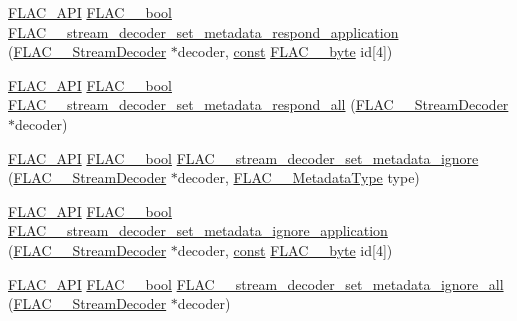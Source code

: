 \begin{DoxyCompactItemize}
\item 
\hyperlink{group__flac__export_ga56ca07df8a23310707732b1c0007d6f5}{F\+L\+A\+C\+\_\+\+A\+PI} \hyperlink{ordinals_8h_a95103469f1cbd78b8cf250194985b34e}{F\+L\+A\+C\+\_\+\+\_\+bool} \hyperlink{group__flac__stream__decoder_gabf2a1e945eb2a158090665e03ff55ad2}{F\+L\+A\+C\+\_\+\+\_\+stream\+\_\+decoder\+\_\+set\+\_\+metadata\+\_\+respond\+\_\+application} (\hyperlink{struct_f_l_a_c_____stream_decoder}{F\+L\+A\+C\+\_\+\+\_\+\+Stream\+Decoder} $\ast$decoder, \hyperlink{zconf_8h_a2c212835823e3c54a8ab6d95c652660e}{const} \hyperlink{ordinals_8h_a5eb569b12d5b047cdacada4d57924ee3}{F\+L\+A\+C\+\_\+\+\_\+byte} id\mbox{[}4\mbox{]})
\item 
\hyperlink{group__flac__export_ga56ca07df8a23310707732b1c0007d6f5}{F\+L\+A\+C\+\_\+\+A\+PI} \hyperlink{ordinals_8h_a95103469f1cbd78b8cf250194985b34e}{F\+L\+A\+C\+\_\+\+\_\+bool} \hyperlink{group__flac__stream__decoder_gaf3bec52172d727a4db8209b82db00c84}{F\+L\+A\+C\+\_\+\+\_\+stream\+\_\+decoder\+\_\+set\+\_\+metadata\+\_\+respond\+\_\+all} (\hyperlink{struct_f_l_a_c_____stream_decoder}{F\+L\+A\+C\+\_\+\+\_\+\+Stream\+Decoder} $\ast$decoder)
\item 
\hyperlink{group__flac__export_ga56ca07df8a23310707732b1c0007d6f5}{F\+L\+A\+C\+\_\+\+A\+PI} \hyperlink{ordinals_8h_a95103469f1cbd78b8cf250194985b34e}{F\+L\+A\+C\+\_\+\+\_\+bool} \hyperlink{group__flac__stream__decoder_ga0fb395d7c18c136d5a84869f6f2d736f}{F\+L\+A\+C\+\_\+\+\_\+stream\+\_\+decoder\+\_\+set\+\_\+metadata\+\_\+ignore} (\hyperlink{struct_f_l_a_c_____stream_decoder}{F\+L\+A\+C\+\_\+\+\_\+\+Stream\+Decoder} $\ast$decoder, \hyperlink{group__flac__format_gac71714ba8ddbbd66d26bb78a427fac01}{F\+L\+A\+C\+\_\+\+\_\+\+Metadata\+Type} type)
\item 
\hyperlink{group__flac__export_ga56ca07df8a23310707732b1c0007d6f5}{F\+L\+A\+C\+\_\+\+A\+PI} \hyperlink{ordinals_8h_a95103469f1cbd78b8cf250194985b34e}{F\+L\+A\+C\+\_\+\+\_\+bool} \hyperlink{group__flac__stream__decoder_gac5eb8b3cb8df3afe788046317fbe9fb6}{F\+L\+A\+C\+\_\+\+\_\+stream\+\_\+decoder\+\_\+set\+\_\+metadata\+\_\+ignore\+\_\+application} (\hyperlink{struct_f_l_a_c_____stream_decoder}{F\+L\+A\+C\+\_\+\+\_\+\+Stream\+Decoder} $\ast$decoder, \hyperlink{zconf_8h_a2c212835823e3c54a8ab6d95c652660e}{const} \hyperlink{ordinals_8h_a5eb569b12d5b047cdacada4d57924ee3}{F\+L\+A\+C\+\_\+\+\_\+byte} id\mbox{[}4\mbox{]})
\item 
\hyperlink{group__flac__export_ga56ca07df8a23310707732b1c0007d6f5}{F\+L\+A\+C\+\_\+\+A\+PI} \hyperlink{ordinals_8h_a95103469f1cbd78b8cf250194985b34e}{F\+L\+A\+C\+\_\+\+\_\+bool} \hyperlink{group__flac__stream__decoder_ga6e515420f5b2a5422cd333b3d4c21064}{F\+L\+A\+C\+\_\+\+\_\+stream\+\_\+decoder\+\_\+set\+\_\+metadata\+\_\+ignore\+\_\+all} (\hyperlink{struct_f_l_a_c_____stream_decoder}{F\+L\+A\+C\+\_\+\+\_\+\+Stream\+Decoder} $\ast$decoder)

\end{DoxyCompactItemize}

